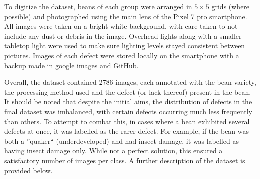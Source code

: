 To digitize the dataset, beans of each group were arranged in $5 \times 5$ grids
(where possible) and photographed using the main lens of the Pixel 7 pro smartphone.
All images were taken on a bright white background, with care taken to not include any dust or debris in the image.
Overhead lights along with a smaller tabletop light were used to make sure lighting levels stayed consistent between pictures.
Images of each defect were stored locally on the smartphone with a backup made
in google images and GitHub.

Overall, the dataset contained 2786 images, each annotated with the bean variety,
the processing method used and the defect (or lack thereof) present in the bean.
It should be noted that despite the initial aims, the distribution of defects in
the final dataset was imbalanced, with certain defects occurring much less
frequently than others.
To attempt to combat this, in cases where a bean
exhibited several defects at once, it was labelled as the rarer defect.
For
example, if the bean was both a ''quaker`` (underdeveloped) and had insect damage,
it was labelled as having insect damage only.
While not a perfect solution, this
ensured a satisfactory number of images per class.
A further description of the dataset
is provided below.

